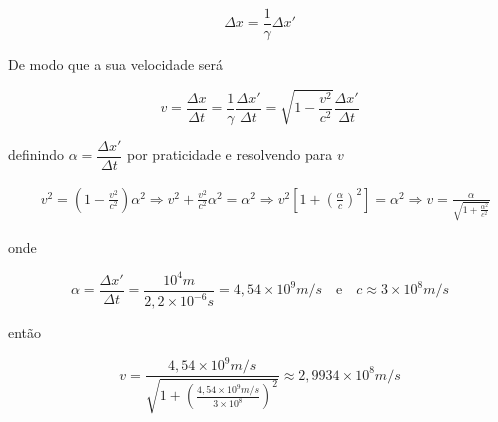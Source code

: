 \documentclass[10pt,a4paper]{article}
\begin{document}
	\begin{equation*}
		\Delta x = \frac{1}{\gamma}\Delta x'
	\end{equation*}
	
	
	De modo que a sua velocidade será 
	
	\begin{equation*}
		v = \frac{\Delta x}{\Delta t} = \frac{1}{\gamma}\frac{\Delta x'}{\Delta t} = \sqrt{1-\frac{v^2}{c^2}}\frac{\Delta x'}{\Delta t} 
	\end{equation*}
	
	definindo $\alpha = \dfrac{\Delta x'}{\Delta t}$ por praticidade e resolvendo para \(v\)
	
	\begin{equation*}
		\begin{split}
			&v^2 = \left(1 -\frac{v^2}{c^2}\right)\alpha^2 \Rightarrow v^2 + \frac{v^2}{c^2}\alpha^2 = \alpha^2 \Rightarrow v^2\left[1 + \left(\frac{\alpha}{c}\right)^2\right] = \alpha^2 \Rightarrow v = \frac{\alpha}{\sqrt{1+\frac{\alpha^2}{c^2}}}
		\end{split}
	\end{equation*}
	
	onde 
	
	\begin{equation}\nonumber
		\alpha = \frac{\Delta x'}{\Delta t} = \frac{10^4 \si{m}}{2,2\times 10^{-6}\si{s}} = 4,54\times 10^9\si{m/s} \quad \text{e} \quad c\approx 3\times 10^8\si{m/s}
	\end{equation}
	
	então
	
	\begin{equation}\nonumber
		v = \frac{4,54\times 10^9\si{m/s}}{\sqrt{1+\left(\frac{4,54\times 10^9\si{m/s}}{3\times 10^8}\right)^2}} \approx 2,9934 \times 10^8 \si{m/s}
	\end{equation}
\end{document}
